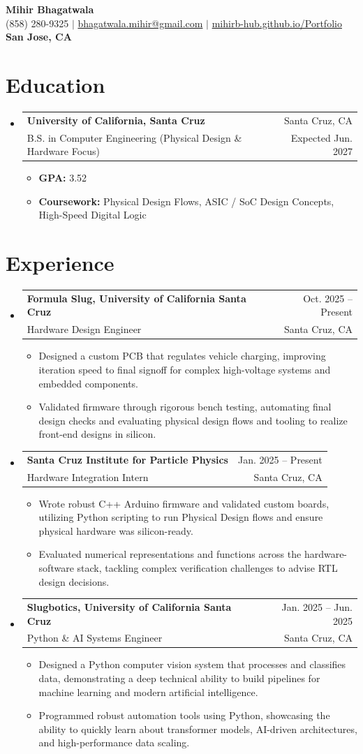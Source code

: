 \documentclass[letterpaper,12pt]{article}
\makeatletter
\newcommand{\resumeItem}[1]{\item{#1}}
\newcommand{\resumeSubheading}[4]{
  \item
    \begin{tabular*}{0.97\textwidth}[t]{l@{\extracolsep{\fill}}r}
      \textbf{#1} & #2 \\
      #3 & #4 \\
    \end{tabular*}
}
\newcommand{\resumeSubHeadingListStart}{\begin{itemize}[label=\textbullet]}
\newcommand{\resumeSubHeadingListEnd}{\end{itemize}}
\newcommand{\resumeItemListStart}{\begin{itemize}[label=-]}
\newcommand{\resumeItemListEnd}{\end{itemize}}
\makeatother
\begin{document}
\begin{center}
  {\Large\bfseries Mihir Bhagatwala} \\
  {(858) 280-9325 $\vert$ \href{mailto:bhagatwala.mihir@gmail.com}{bhagatwala.mihir@gmail.com} $\vert$ \href{https://mihirb-hub.github.io/Portfolio/}{mihirb-hub.github.io/Portfolio}} \\
  {\textbf{San Jose, CA}}
\end{center}

\section{Education}
\resumeSubHeadingListStart
  \resumeSubheading{University of California, Santa Cruz}{Santa Cruz, CA}{B.S. in Computer Engineering (Physical Design \& Hardware Focus)}{Expected Jun. 2027}
  \resumeItemListStart
    \resumeItem{\textbf{GPA:} 3.52}
    \resumeItem{\textbf{Coursework:} Physical Design Flows, ASIC / SoC Design Concepts, High-Speed Digital Logic}
  \resumeItemListEnd
\resumeSubHeadingListEnd

\section{Experience}
\resumeSubHeadingListStart
  \resumeSubheading{Formula Slug, University of California Santa Cruz}{Oct. 2025 -- Present}{Hardware Design Engineer}{Santa Cruz, CA}
  \resumeItemListStart
    \resumeItem{Designed a custom PCB that regulates vehicle charging, improving iteration speed to final signoff for complex high-voltage systems and embedded components.}
    \resumeItem{Validated firmware through rigorous bench testing, automating final design checks and evaluating physical design flows and tooling to realize front-end designs in silicon.}
  \resumeItemListEnd

  \resumeSubheading{Santa Cruz Institute for Particle Physics}{Jan. 2025 -- Present}{Hardware Integration Intern}{Santa Cruz, CA}
  \resumeItemListStart
    \resumeItem{Wrote robust C++ Arduino firmware and validated custom boards, utilizing Python scripting to run Physical Design flows and ensure physical hardware was silicon-ready.}
    \resumeItem{Evaluated numerical representations and functions across the hardware-software stack, tackling complex verification challenges to advise RTL design decisions.}
  \resumeItemListEnd

  \resumeSubheading{Slugbotics, University of California Santa Cruz}{Jan. 2025 -- Jun. 2025}{Python \& AI Systems Engineer}{Santa Cruz, CA}
  \resumeItemListStart
    \resumeItem{Designed a Python computer vision system that processes and classifies data, demonstrating a deep technical ability to build pipelines for machine learning and modern artificial intelligence.}
    \resumeItem{Programmed robust automation tools using Python, showcasing the ability to quickly learn about transformer models, AI-driven architectures, and high-performance data scaling.}
  \resumeItemListEnd
\resumeSubHeadingListEnd
\end{document}
